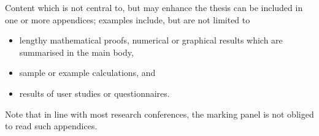 \documentclass[ %
                    author={Luke Murray},
                supervisor={Dr. Simon Hollis},
                     title={Shadow Peer-to-Peer Networks},
                  subtitle={},
                    degree={MEng},
                      year={2013} ]{thesis}
\begin{document}
Content which is not central to, but may enhance the thesis can be
included in one or more appendices; examples include, but are not 
limited to

\begin{itemize}
\item lengthy mathematical proofs, numerical or graphical results
      which are summarised in the main body,
\item sample or example calculations, 
      and
\item results of user studies or questionnaires.
\end{itemize}

\noindent
Note that in line with most research conferences, the marking panel 
is not obliged to read such appendices.

\end{document}
